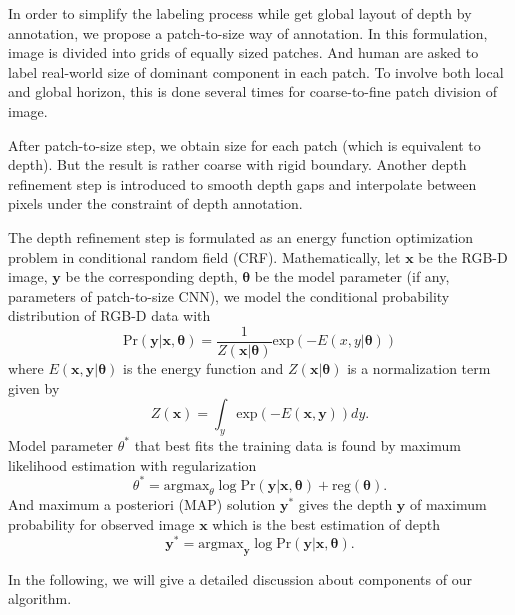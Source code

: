 \documentclass[10pt,twocolumn,letterpaper]{article}
\begin{document}
\par
In order to simplify the labeling process while get global layout of depth by annotation, we propose a patch-to-size way of annotation. In this formulation, image is divided into grids of equally sized patches. And human are asked to label real-world size of dominant component in each patch. To involve both local and global horizon, this is done several times for coarse-to-fine patch division of image.
\par
After patch-to-size step, we obtain size for each patch (which is equivalent to depth). But the result is rather coarse with rigid boundary. Another depth refinement step is introduced to smooth depth gaps and interpolate between pixels under the constraint of depth annotation. 
\par
The depth refinement step is formulated as an energy function optimization problem in conditional random field (CRF). Mathematically, let $\mathbf{x}$ be the RGB-D image, $\mathbf{y}$ be the corresponding depth, $\mathbf{\theta}$ be the model parameter (if any, \eg parameters of patch-to-size CNN), we model the conditional probability distribution of RGB-D data with
\begin{equation}
\text{Pr}(\mathbf{y}|\mathbf{x}, \mathbf{\theta}) = \frac{1}{Z(\mathbf{x}|\mathbf{\theta})}\text{exp}(-E(x, y|\mathbf{\theta}))
\end{equation}
where $E(\mathbf{x}, \mathbf{y}|\mathbf{\theta})$ is the energy function and $Z(\mathbf{x}|\mathbf{\theta})$ is a normalization term given by
\begin{equation}
Z(\mathbf{x}) = \int_y\text{exp}(-E(\mathbf{x}, \mathbf{y})) dy.
\end{equation}
Model parameter $\theta^*$ that best fits the training data is found by maximum likelihood estimation with regularization
\begin{equation}
\theta^* = \text{argmax}_{\theta} \log \text{Pr}(\mathbf{y}|\mathbf{x}, \mathbf{\theta}) + \text{reg}(\mathbf{\theta}).
\end{equation}
And maximum a posteriori (MAP) solution $\mathbf{y}^*$ gives the depth $\mathbf{y}$ of maximum probability for observed image $\mathbf{x}$ which is the best estimation of depth
\begin{equation}
\mathbf{y^*} = \text{argmax}_{\mathbf{y}} \log \text{Pr}(\mathbf{y}|\mathbf{x}, \mathbf{\theta}).
\end{equation}
\par
In the following, we will give a detailed discussion about components of our algorithm.
\end{document}

